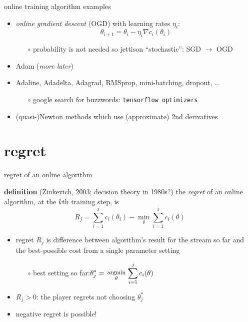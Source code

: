 \documentclass[xcolor={svgnames},
               hyperref={colorlinks,citecolor=DeepPink4,linkcolor=FireBrick,urlcolor=Maroon}]
               {beamer}
\newcommand{\grad}{\nabla}
\newcommand{\ds}{\displaystyle}
\begin{document}
\begin{frame}{online training algorithm examples}

\begin{itemize}
\item \emph{online gradient descent} (OGD) with learning rates $\eta_i$:
   $$\theta_{i+1} = \theta_i - \eta_i \grad c_i(\theta_i)$$

    \begin{itemize}
    \item[$\circ$] probability is not needed so jettison ``stochastic'': SGD $\to$ OGD
    \end{itemize}
\item Adam (\emph{more later})
\item Adaline, Adadelta, Adagrad, RMSprop, mini-batching, dropout, \dots
    \begin{itemize}
    \item[$\circ$] google search for buzzwords: \quad \texttt{tensorflow optimizers}
    \end{itemize}
\item (quasi-)Newton methods which use (approximate) 2nd derivatives
\end{itemize}
\end{frame}


\section{regret}

\begin{frame}{regret of an online algorithm}

\begin{block}{\textbf{definition} (Zinkevich, 2003; decision theory in 1980s?)}
the \emph{regret} of an online algorithm, at the $k$th training step, is
    $$R_j = \sum_{i=1}^j c_i(\theta_i) - \min_\theta \sum_{i=1}^j c_i(\theta)$$
\end{block}

\begin{itemize}
\item regret $R_j$ is difference between algorithm's result for the stream so far and the best-possible cost from a single parameter setting
    \begin{itemize}
    \item[$\circ$] best setting so far:\quad  $\ds \theta_j^* = \begin{smallmatrix} \phantom{x} \\ \text{\footnotesize argmin} \\ \theta \end{smallmatrix} \sum_{i=1}^j c_i(\theta)$
    \end{itemize}

\smallskip
\item $R_j>0$: the player regrets not choosing $\theta_j^*$
\item negative regret is possible!
\end{itemize}
\end{frame}
\end{document}
